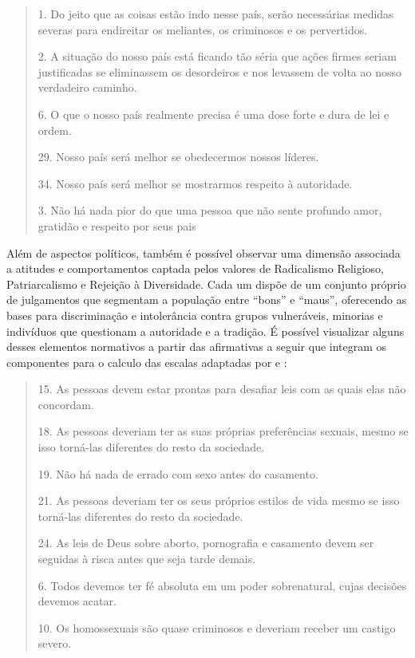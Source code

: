 \documentclass[
12pt,				%
openright,			%
twoside,			%
a4paper,			%
english,			%
french,				%
spanish,			%
brazil				%
]{abntex2}
\begin{document}
\begin{quote}
	1. Do jeito que as coisas estão indo nesse país, serão necessárias medidas severas para endireitar os meliantes, os criminosos e os pervertidos.
	
	2. A situação do nosso país está ficando tão séria que ações firmes seriam justificadas se eliminassem os desordeiros e nos levassem de volta ao nosso verdadeiro caminho.
	
	6. O que o nosso país realmente precisa é uma dose forte e dura de lei e ordem.
	
	29. Nosso país será melhor se obedecermos nossos líderes.
	
	34. Nosso país será melhor se mostrarmos respeito à autoridade.
	
	3. Não há nada pior do que uma pessoa que não sente profundo amor, gratidão e respeito por seus pais
	
	\cite{vilanova2018adaptaccao, de2018analises}
	
\end{quote}  

Além de aspectos políticos, também é possível observar uma dimensão associada a atitudes e comportamentos captada pelos valores de Radicalismo Religioso, Patriarcalismo e Rejeição à Diversidade. Cada um dispõe de um conjunto próprio de julgamentos que segmentam a população entre ``bons'' e ``maus'', oferecendo as bases para discriminação e intolerância contra grupos vulneráveis, minorias e indivíduos que questionam a autoridade e a tradição. É possível visualizar alguns desses elementos normativos a partir das afirmativas a seguir que integram os componentes para o calculo das escalas adaptadas por  e :
 
\begin{quote}
	
	15. As pessoas devem estar prontas para desafiar leis com as quais elas não concordam.
	
	
	18. As pessoas deveriam ter as suas próprias preferências sexuais, mesmo se isso torná-las diferentes do resto da sociedade.
	
	19. Não há nada de errado com sexo antes do casamento.
	
	21. As pessoas deveriam ter os seus próprios estilos de vida mesmo se isso torná-las diferentes do resto da sociedade.
	
	24. As leis de Deus sobre aborto, pornografia e casamento devem ser seguidas à risca antes que seja tarde demais.
	
	6. Todos devemos ter fé absoluta em um poder sobrenatural, cujas decisões devemos acatar.
	
	10. Os homossexuais são quase criminosos e deveriam receber um castigo severo.
	
	\cite{vilanova2018adaptaccao, de2018analises}
	
\end{quote}
\end{document}
